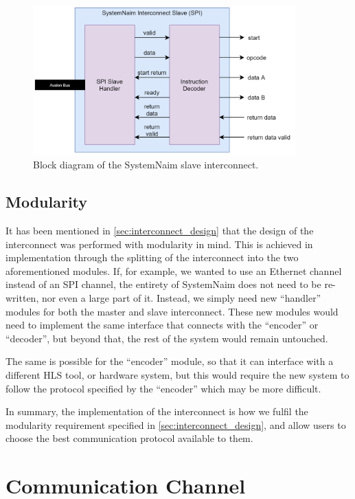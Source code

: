 \begin{figure}[!htb]
    \centering
    \includegraphics[width=0.9\textwidth]{04_Implementation/images/interconnect_slave.png}
    \caption{Block diagram of the SystemNaim slave interconnect.}
    \label{fig:slave_interconnect}
\end{figure}

\subsection{Modularity}

It has been mentioned in \autoref{sec:interconnect_design} that the design of the interconnect was performed with modularity in mind. This is achieved in implementation through the splitting of the interconnect into the two aforementioned modules. If, for example, we wanted to use an Ethernet channel instead of an SPI channel, the entirety of SystemNaim does not need to be re-written, nor even a large part of it. Instead, we simply need new “handler” modules for both the master and slave interconnect. These new modules would need to implement the same interface that connects with the “encoder” or “decoder”, but beyond that, the rest of the system would remain untouched. 

The same is possible for the “encoder” module, so that it can interface with a different HLS tool, or hardware system, but this would require the new system to follow the protocol specified by the “encoder” which may be more difficult.

In summary, the implementation of the interconnect is how we fulfil the modularity requirement specified in \autoref{sec:interconnect_design}, and allow users to choose the best communication protocol available to them.

\section{Communication Channel}

